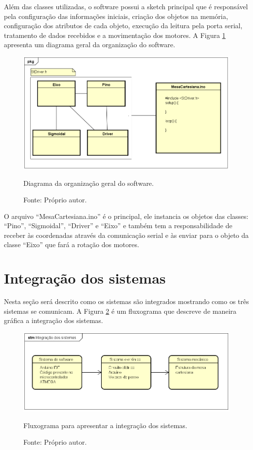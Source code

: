 Além das classes utilizadas, o software possui a sketch principal que é responsável pela configuração das 
informações iniciais, criação dos objetos na memória, configuração dos atributos de cada objeto, execução 
da leitura pela porta serial, tratamento de dados recebidos e a movimentação dos motores.
A Figura \ref{fig:orgsoftware} apresenta um diagrama geral da organização do software.

\begin{figure}[H]
\centering
\includegraphics[width = 1\linewidth]{figuras/orgsoftware}
\caption{Diagrama da organização geral do software.}
\caption*{Fonte: Próprio autor.}
\label{fig:orgsoftware}
\end{figure}
    
O arquivo “MesaCartesiana.ino” é o principal, ele instancia os objetos das classes: “Pino”, “Sigmoidal”, 
“Driver” e “Eixo” e também tem a responsabilidade de receber às coordenadas através da comunicação serial 
e às enviar para o objeto da classe “Eixo” que fará a rotação dos motores.

\section{Integração dos sistemas}\label{subsec:metintegracao}

Nesta seção será descrito como os sistemas são integrados mostrando como os três sistemas se comunicam. 
A Figura \ref{fig:integracao} é um fluxograma que descreve de maneira gráfica a integração dos sistemas.

\begin{figure}[H]
\centering
\includegraphics[width = 1\linewidth]{figuras/integracao}
\caption{Fluxograma para apresentar a integração dos sistemas.}
\caption*{Fonte: Próprio autor.}
\label{fig:integracao}
\end{figure}
    
